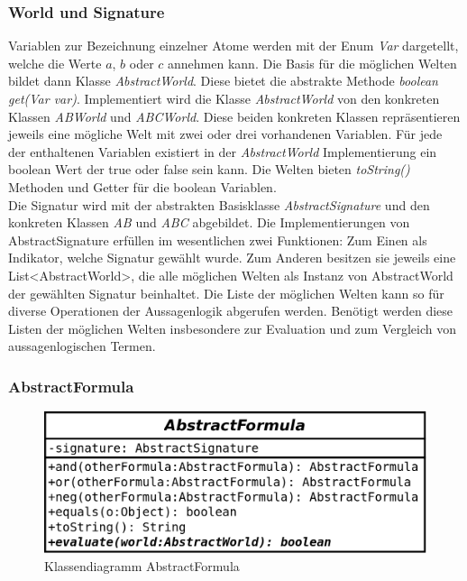 \documentclass[12pt,a4paper]{article}
\begin{document}
\subsubsection{World und Signature}
Variablen zur Bezeichnung einzelner Atome werden mit der Enum \textit{Var} dargetellt, welche die Werte $a$, $b$ oder $c$ annehmen kann. Die Basis für die möglichen Welten bildet dann Klasse \textit{AbstractWorld}. Diese bietet die abstrakte Methode \textit{boolean get(Var var)}. Implementiert wird die Klasse \textit{AbstractWorld} von den konkreten Klassen \textit{ABWorld} und  \textit{ABCWorld}. Diese beiden konkreten Klassen repräsentieren jeweils eine mögliche Welt mit zwei oder drei vorhandenen Variablen. Für jede der enthaltenen Variablen existiert in der \textit{AbstractWorld} Implementierung ein boolean Wert der true oder false sein kann. Die Welten bieten \textit{toString()} Methoden und Getter für die boolean Variablen. \\
Die Signatur wird mit der abstrakten Basisklasse  \textit{AbstractSignature} und den konkreten Klassen \textit{AB} und  \textit{ABC} abgebildet. Die Implementierungen von AbstractSignature erfüllen im wesentlichen zwei Funktionen: Zum Einen als Indikator, welche Signatur gewählt wurde. Zum Anderen besitzen sie jeweils eine List<AbstractWorld>,  die alle möglichen Welten als Instanz von AbstractWorld der gewählten Signatur beinhaltet. Die Liste der möglichen Welten kann so für diverse Operationen der Aussagenlogik abgerufen werden. Benötigt werden diese Listen der möglichen Welten insbesondere zur Evaluation und zum Vergleich von aussagenlogischen Termen.

\subsubsection{AbstractFormula}


\begin{figure}
\includegraphics[width=0.55\linewidth]{bilder/AbstractFormula.png}
\caption{Klassendiagramm AbstractFormula}
\label{pic:abstractformula}
\end{figure}
\end{document}
